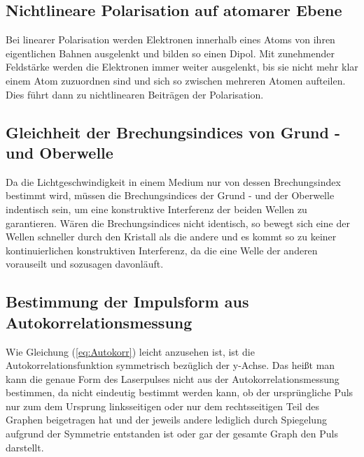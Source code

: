 \subsection{Nichtlineare Polarisation auf atomarer Ebene}
Bei linearer Polarisation werden Elektronen innerhalb eines Atoms von ihren eigentlichen Bahnen ausgelenkt und bilden so einen Dipol. Mit zunehmender Feldstärke werden die Elektronen immer weiter ausgelenkt, bis sie nicht mehr klar einem Atom zuzuordnen sind und sich so zwischen mehreren Atomen aufteilen. Dies führt dann zu nichtlinearen Beiträgen der Polarisation.
\subsection{Gleichheit der Brechungsindices von Grund - und Oberwelle}
Da die Lichtgeschwindigkeit in einem Medium nur von dessen Brechungsindex bestimmt wird, müssen die Brechungsindices der Grund - und der Oberwelle indentisch sein, um eine konstruktive Interferenz der beiden Wellen zu garantieren. Wären die Brechungsindices nicht identisch, so bewegt sich eine der Wellen schneller durch den Kristall als die andere und es kommt so zu keiner kontinuierlichen konstruktiven Interferenz, da die eine Welle der anderen vorauseilt und sozusagen davonläuft. 
\subsection{Bestimmung der Impulsform aus Autokorrelationsmessung}
Wie Gleichung (\ref{eq:Autokorr}) leicht anzusehen ist, ist die Autokorrelationsfunktion symmetrisch bezüglich der y-Achse. Das heißt man kann die genaue Form des Laserpulses nicht aus der Autokorrelationsmessung bestimmen, da nicht eindeutig bestimmt werden kann, ob der ursprüngliche Puls nur zum dem Ursprung linksseitigen oder nur dem rechtsseitigen Teil des Graphen beigetragen hat und der jeweils andere lediglich durch Spiegelung aufgrund der Symmetrie entstanden ist oder gar der gesamte Graph den Puls darstellt.
